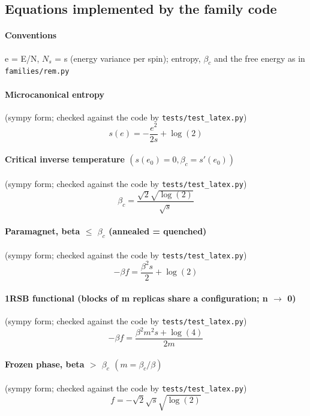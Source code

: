 \documentclass[11pt]{article}
\begin{document}
\subsection{Equations implemented by the family code}
\paragraph{Conventions}
e = E/N, $N_{s}$ = s (energy variance per spin); entropy, $\beta _{c}$ and the free energy as in \texttt{families/rem.py}
\paragraph{Microcanonical entropy} \cite{b1,b2} (sympy form; checked against the code by \texttt{tests/test\_latex.py})
\begin{equation}
s{\left(e \right)} = - \frac{e^{2}}{2 s} + \log{\left(2 \right)}
\end{equation}
\paragraph{Critical inverse temperature $(s(e_{0}) = 0, \beta _{c} = s'(e_{0}))$} (sympy form; checked against the code by \texttt{tests/test\_latex.py})
\begin{equation}
\beta_{c} = \frac{\sqrt{2} \sqrt{\log{\left(2 \right)}}}{\sqrt{s}}
\end{equation}
\paragraph{Paramagnet, beta $\leq$ $\beta _{c}$ (annealed = quenched)} (sympy form; checked against the code by \texttt{tests/test\_latex.py})
\begin{equation}
- \beta f = \frac{\beta^{2} s}{2} + \log{\left(2 \right)}
\end{equation}
\paragraph{1RSB functional (blocks of m replicas share a configuration; n $\to$ 0)} (sympy form; checked against the code by \texttt{tests/test\_latex.py})
\begin{equation}
- \beta f = \frac{\beta^{2} m^{2} s + \log{\left(4 \right)}}{2 m}
\end{equation}
\paragraph{Frozen phase, beta $>$ $\beta _{c}$ $(m = \beta _{c} / \beta )$} (sympy form; checked against the code by \texttt{tests/test\_latex.py})
\begin{equation}
f = - \sqrt{2} \sqrt{s} \sqrt{\log{\left(2 \right)}}
\end{equation}
\end{document}
